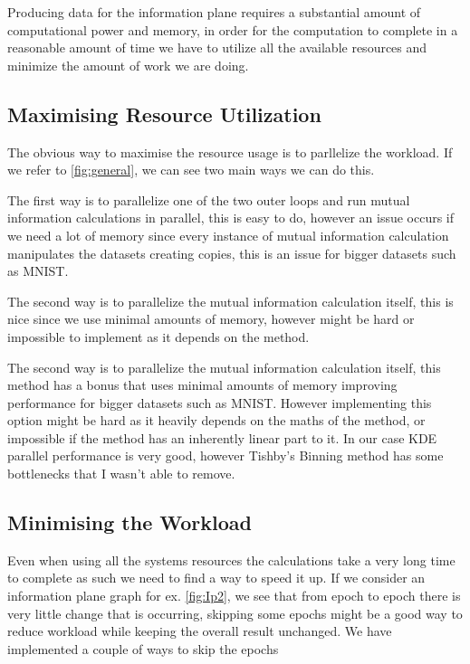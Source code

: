 \documentclass[dissertation.tex]{subfiles}
\begin{document}
Producing data for the information plane requires a substantial amount of
computational power and memory, in order for the computation to complete in a
reasonable amount of time we have to utilize all the available resources and
minimize the amount of work we are doing.

\subsection{Maximising Resource Utilization}

The obvious way to maximise the resource usage is to parllelize the workload.
If we refer to \autoref{fig:general}, we can see two main ways we can do this.

The first way is to parallelize one of the two outer loops and run mutual
information calculations in parallel, this is easy to do, however an issue
occurs if we need a lot of memory since every instance of mutual information
calculation manipulates the datasets creating copies, this is an issue for
bigger datasets such as MNIST.

The second way is to parallelize the mutual information calculation itself, this
is nice since we use minimal amounts of memory, however might be hard or
impossible to implement as it depends on the method.

The second way is to parallelize the mutual information calculation itself, this
method has a  bonus that uses minimal amounts of memory improving performance
for bigger datasets such as MNIST. However implementing this option might be
hard as it heavily depends on the maths of the method, or impossible if the
method has an inherently linear part to it. In our case KDE parallel performance
is very good, however Tishby's Binning method has some bottlenecks that I
wasn't able to remove.

\subsection{Minimising the Workload}

Even when using all the systems resources the calculations take a very long
time to complete as such we need to find a way to speed it up. If we consider an
information plane graph for ex. \autoref{fig:Ip2}, we see that from epoch to
epoch there is very little change that is occurring, skipping some epochs might
be a good way to reduce workload while keeping the overall result unchanged. We
have implemented a couple of ways to skip the epochs 
\end{document}
